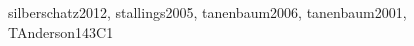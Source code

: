 \begin{syllabus}
\begin{unit}{\OSOverviewofOperatingSystems}{}{silberschatz2012, stallings2005, tanenbaum2006, tanenbaum2001, TAnderson14}{3}{C1}
\begin{topics}%
      \item \OSOverviewofOperatingSystemsTopicRole
      \item \OSOverviewofOperatingSystemsTopicFunctionality
      \item \OSOverviewofOperatingSystemsTopicMechanisms
      \item \OSOverviewofOperatingSystemsTopicDesign
      \item \OSOverviewofOperatingSystemsTopicInfluences
\end{topics}
\begin{learningoutcomes}
	\item \OSOverviewofOperatingSystemsLOExplainTheFunctions [\Familiarity]
	\item \OSOverviewofOperatingSystemsLOAnalyzeTheIn [\Assessment]
	\item \OSOverviewofOperatingSystemsLODescribeTheASystem [\Familiarity]
	\item \OSOverviewofOperatingSystemsLODiscussNetworked [\Familiarity]
	\item \OSOverviewofOperatingSystemsLOIdentifyPotential [\Familiarity]
\end{learningoutcomes}
\end{unit}


\end{syllabus}

